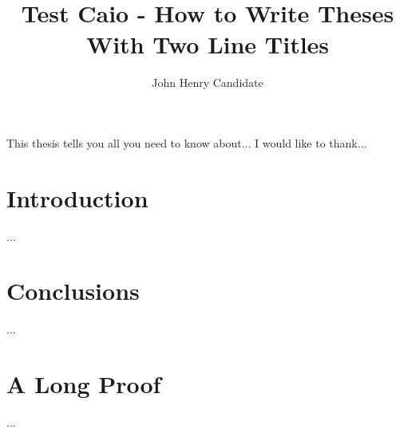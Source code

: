 \documentclass{report}
\begin{document}

\title{Test Caio - How to Write Theses\\
            With Two Line Titles}
\author{John Henry Candidate}
 
\beforepreface
{}
This thesis tells you all you need to know about...
I would like to thank...
\afterpreface

\chapter{Introduction}
...
\chapter{Conclusions}
...
\appendix
\chapter{A Long Proof}
...


\end{document}

